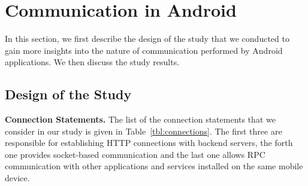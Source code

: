 \begin{table}[t]
\caption{Considered Connection Statements.}
\label{tbl:connections}
\centering
\tabcolsep=1.5pt
\end{table}




\section{Communication in Android}
\label{sec:study} 

In this section, we first describe the design of the study that we conducted to gain more insights into the nature of communication performed by Android applications. We then discuss the study results. 

\subsection{Design of the Study}

\vspace{0.1in}
\noindent 
{\bf Connection Statements.}
The list of the connection statements that we consider in our study is given in Table~\ref{tbl:connections}.
The first three are responsible for establishing HTTP connections with backend servers, the forth one provides socket-based communication and the last one allows 
RPC communication with other applications and services installed on the same mobile device. 



